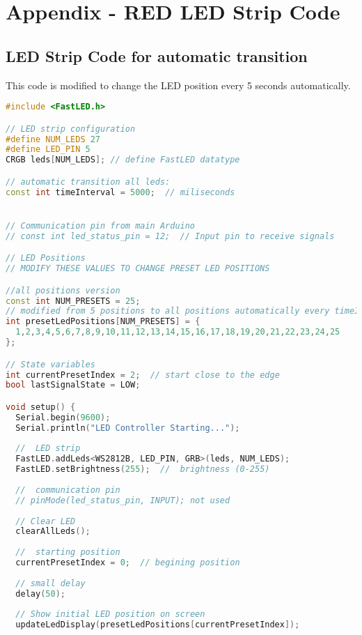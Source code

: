 \section{Appendix - RED LED Strip Code}
\subsection{LED Strip Code for automatic transition}
\label{REDappendix}
This code is modified to change the LED position every 5 seconds automatically.


\begin{lstlisting}[style=cstyle, caption=Cpp Code of the RGB strip with automatic changes, label=lst:RGBcodeAutomatic, language=c++ ]
    #include <FastLED.h>

// LED strip configuration
#define NUM_LEDS 27
#define LED_PIN 5
CRGB leds[NUM_LEDS]; // define FastLED datatype

// automatic transition all leds:
const int timeInterval = 5000;  // miliseconds


// Communication pin from main Arduino
// const int led_status_pin = 12;  // Input pin to receive signals

// LED Positions 
// MODIFY THESE VALUES TO CHANGE PRESET LED POSITIONS

//all positions version
const int NUM_PRESETS = 25;
// modified from 5 positions to all positions automatically every timeInterval seconds
int presetLedPositions[NUM_PRESETS] = {
  1,2,3,4,5,6,7,8,9,10,11,12,13,14,15,16,17,18,19,20,21,22,23,24,25   
};

// State variables
int currentPresetIndex = 2;  // start close to the edge
bool lastSignalState = LOW;

void setup() {
  Serial.begin(9600);
  Serial.println("LED Controller Starting...");
 
  //  LED strip
  FastLED.addLeds<WS2812B, LED_PIN, GRB>(leds, NUM_LEDS);
  FastLED.setBrightness(255);  //  brightness (0-255)
 
  //  communication pin
  // pinMode(led_status_pin, INPUT); not used
 
  // Clear LED
  clearAllLeds();
  
  //  starting position
  currentPresetIndex = 0;  // begining position 
  
  // small delay
  delay(50);
 
  // Show initial LED position on screen
  updateLedDisplay(presetLedPositions[currentPresetIndex]);
  

\end{lstlisting}
